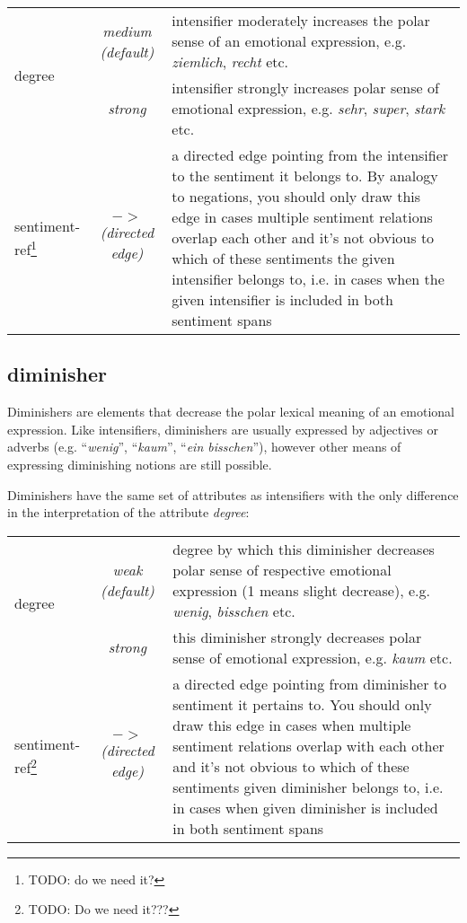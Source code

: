 \documentclass[11pt,a4paper]{article}
\begin{document}
\begin{tabular}{|l|c|p{}|}\hline
  \multirow{2}{*}{degree} & \textit{medium (default)} & intensifier
  moderately increases the polar sense of an emotional expression,
  e.g. \textit{ziemlich}, \textit{recht} etc.\\\cline{2-3}

  & \textit{strong} & intensifier strongly increases polar sense of
  emotional expression, e.g. \textit{sehr}, \textit{super},
  \textit{stark} etc.\\\hline


  sentiment-ref\footnote{TODO: do we need it?} &
  \textit{$->$\newline(directed edge)} & a directed edge pointing from
  the intensifier to the sentiment it belongs to. By analogy to
  negations, you should only draw this edge in cases multiple
  sentiment relations overlap each other and it's not obvious to which
  of these sentiments the given intensifier belongs to, i.e. in cases
  when the given intensifier is included in both sentiment
  spans\\\hline
\end{tabular}

\subsection{diminisher}
Diminishers are elements that decrease the polar lexical meaning of an
emotional expression.  Like intensifiers, diminishers are usually
expressed by adjectives or adverbs (e.g. ``\textit{wenig}'',
``\textit{kaum}'', ``\textit{ein bisschen}''), however other means of
expressing diminishing notions are still possible.

Diminishers have the same set of attributes as intensifiers with the
only difference in the interpretation of the attribute
\textit{degree}:

\begin{tabular}{|l|c|p{}|}\hline
  \multirow{2}{*}{degree} & \textit{weak (default)} & degree by which
  this diminisher decreases polar sense of respective emotional
  expression (1 means slight decrease), e.g. \textit{wenig},
  \textit{bisschen} etc.\\\cline{2-3}

  & \textit{strong} & this diminisher strongly decreases polar sense
  of emotional expression, e.g. \textit{kaum} etc.\\\hline

  sentiment-ref\footnote{TODO: Do we need it???} &
  \textit{$->$\newline(directed edge)} & a directed edge pointing from
  diminisher to sentiment it pertains to. You should only draw this
  edge in cases when multiple sentiment relations overlap with each
  other and it's not obvious to which of these sentiments given
  diminisher belongs to, i.e. in cases when given diminisher is
  included in both sentiment spans\\\hline
\end{tabular}
\end{document}

